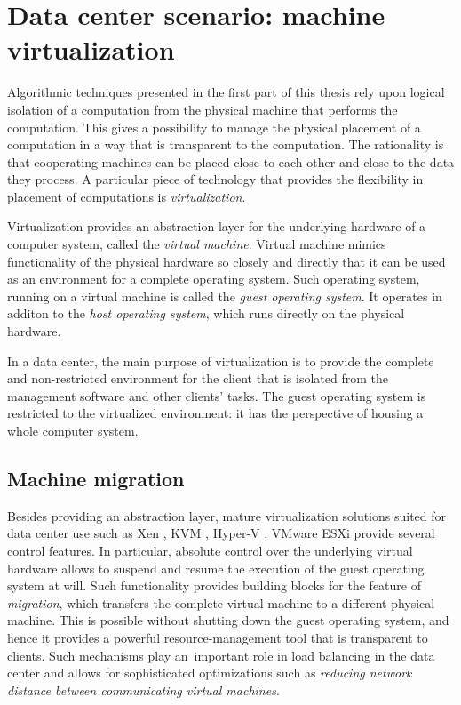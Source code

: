 \section{Data center scenario: machine virtualization}
\label{sec:intro-machine-virtualization}

Algorithmic techniques presented in the first part of this thesis rely upon logical isolation of a computation from the physical machine that performs the computation.
This gives a possibility to manage the physical placement of a computation in a way that is transparent to the computation.
The rationality is that cooperating machines can be placed close to each other and close to the data they process.
A particular piece of technology that provides the flexibility in placement of computations is \emph{virtualization}.

Virtualization provides an abstraction layer for the underlying hardware of a computer system, called the \emph{virtual machine}.
Virtual machine mimics functionality of the physical hardware so closely and
directly that it can be used as an environment for a complete operating system.
Such operating system, running on a virtual machine is called the \emph{guest
operating system}. It operates in additon to the \emph{host operating
system}, which runs directly on the physical hardware. 

In a data center, the main purpose of virtualization is to provide the complete and non-restricted environment for the client that is isolated from the management software and other clients' tasks.
The guest operating system is restricted to the virtualized environment: it has the perspective of housing a whole computer system.


\subsection{Machine migration}

Besides providing an abstraction layer, mature virtualization solutions suited for data center use such as Xen
\cite{url-xen}, KVM \cite{url-kvm}, Hyper-V \cite{url-hyperv}, VMware ESXi
\cite{url-vmware} provide several control features.
In particular, absolute control over the underlying virtual hardware allows to suspend and resume the execution of the guest operating system at will.
Such functionality provides building blocks for the feature of \emph{migration}, which transfers the complete virtual machine to a different physical machine.
This is possible without shutting down the guest operating system, and hence it provides a powerful resource-management tool that is transparent to clients.
Such mechanisms play an~important role in load balancing in the data center and allows for sophisticated optimizations such as \emph{reducing network distance between communicating virtual machines}.

